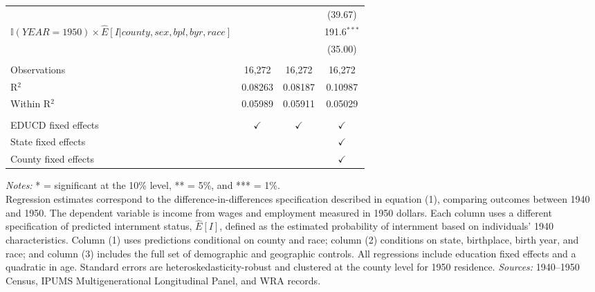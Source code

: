 \begin{table}[htbp]
\begin{adjustbox}{width = \textwidth, center}
\begin{tabular}{lccc}
                                                                      &                 &                 & (39.67)\\   
         $\mathbb{I}(YEAR = 1950)\times\hat{E}[I|county, sex, bpl, byr, race]$   &                 &                 & 191.6$^{***}$\\   
                                                                      &                 &                 & (35.00)\\   
          \\
         Observations                                                 & 16,272          & 16,272          & 16,272\\  
         R$^2$                                                        & 0.08263         & 0.08187         & 0.10987\\  
         Within R$^2$                                                 & 0.05989         & 0.05911         & 0.05029\\  
          \\
         EDUCD fixed effects                                          & $\checkmark$    & $\checkmark$    & $\checkmark$\\   
         State fixed effects                                          &                 &                 & $\checkmark$\\   
         County fixed effects                                         &                 &                 & $\checkmark$\\   
         \bottomrule
      \end{tabular}
   \end{adjustbox}
   {\footnotesize
   \emph{Notes:} * = significant at the 10\% level, ** = 5\%, and *** = 1\%. \\
   Regression estimates correspond to the difference-in-differences specification 
   described in equation (1), comparing outcomes between 1940 and 1950. 
   The dependent variable is income from wages and employment measured in 1950 dollars. 
   Each column uses a different specification of predicted internment status, 
   $\hat{E}[I]$, defined as the estimated probability of internment 
   based on individuals’ 1940 characteristics. 
   Column (1) uses predictions conditional on county and race; 
   column (2) conditions on state, birthplace, birth year, and race; 
   and column (3) includes the full set of demographic and geographic controls. 
   All regressions include education fixed effects and a quadratic in age. 
   Standard errors are heteroskedasticity-robust 
   and clustered at the county level for 1950 residence.
   \emph{Sources:} 1940–1950 Census, IPUMS Multigenerational Longitudinal Panel, and WRA records.

   }
\end{table}
